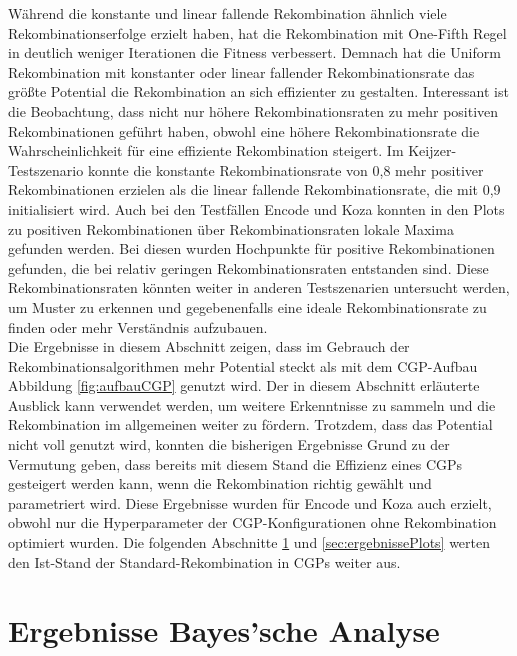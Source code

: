 Während die konstante und linear fallende Rekombination ähnlich viele Rekombinationserfolge erzielt haben, hat die Rekombination mit One-Fifth Regel in deutlich weniger Iterationen die Fitness verbessert.
Demnach hat die Uniform Rekombination mit konstanter oder linear fallender Rekombinationsrate das größte Potential die Rekombination an sich effizienter zu gestalten.
Interessant ist die Beobachtung, dass nicht nur höhere Rekombinationsraten zu mehr positiven Rekombinationen geführt haben, obwohl eine höhere Rekombinationsrate die Wahrscheinlichkeit für eine effiziente Rekombination steigert.
Im Keijzer-Testszenario konnte die konstante Rekombinationsrate von 0,8 mehr positiver Rekombinationen erzielen als die linear fallende Rekombinationsrate, die mit 0,9 initialisiert wird.
Auch bei den Testfällen Encode und Koza konnten in den Plots zu positiven Rekombinationen über Rekombinationsraten lokale Maxima gefunden werden.
Bei diesen wurden Hochpunkte für positive Rekombinationen gefunden, die bei relativ geringen Rekombinationsraten entstanden sind.
Diese Rekombinationsraten könnten weiter in anderen Testszenarien untersucht werden, um Muster zu erkennen und gegebenenfalls eine ideale Rekombinationsrate zu finden oder mehr Verständnis aufzubauen.\\
Die Ergebnisse in diesem Abschnitt zeigen, dass im Gebrauch der Rekombinationsalgorithmen mehr Potential steckt als mit dem CGP-Aufbau Abbildung \ref{fig:aufbauCGP} genutzt wird.
Der in diesem Abschnitt erläuterte Ausblick kann verwendet werden, um weitere Erkenntnisse zu sammeln und die Rekombination im allgemeinen weiter zu fördern.
Trotzdem, dass das Potential nicht voll genutzt wird, konnten die bisherigen Ergebnisse Grund zu der Vermutung geben, dass bereits mit diesem Stand die Effizienz eines CGPs gesteigert werden kann, wenn die Rekombination richtig gewählt und parametriert wird.
Diese Ergebnisse wurden für Encode und Koza auch erzielt, obwohl nur die Hyperparameter der CGP-Konfigurationen ohne Rekombination optimiert wurden.
Die folgenden Abschnitte \ref{sec:ergebnisseBayes} und \ref{sec:ergebnissePlots} werten den Ist-Stand der Standard-Rekombination in CGPs weiter aus.


\section{Ergebnisse Bayes'sche Analyse}
\label{sec:ergebnisseBayes}

